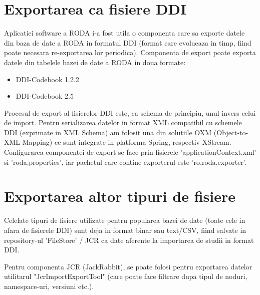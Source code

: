 \section{Exportarea ca fisiere DDI}
Aplicatiei software a RODA i-a fost utila o componenta care sa exporte datele din baza de date a RODA in formatul DDI (format care evolueaza in timp, fiind poate necesara re-exportarea lor periodica).
Componenta de export poate exporta datele din tabelele bazei de date a RODA in doua formate:
\begin{itemize}
\item DDI-Codebook 1.2.2
\item DDI-Codebook 2.5
\end{itemize}

Procesul de export al fisierelor DDI este, ca schema de principiu, unul invers celui de import.
Pentru serializarea datelor in format XML compatibil cu schemele DDI (exprimate in XML Schema) 
am folosit una din solutiile OXM (Object-to-XML Mapping) ce sunt integrate in platforma Spring, respectiv XStream.
Configurarea componentei de export se face prin fisierele 'applicationContext.xml' si 'roda.properties', iar pachetul care contine exporterul este 'ro.roda.exporter'.

\section{Exportarea altor tipuri de fisiere}
Celelate tipuri de fisiere utilizate pentru popularea bazei de date (toate cele in afara de fisierele DDI) sunt deja in format binar sau text/CSV, 
fiind salvate in repository-ul 'FileStore' / JCR ca date aferente la importarea de studii in format DDI.

Pentru componenta JCR (JackRabbit), 
se poate folosi pentru exportarea datelor utilitarul "JcrImportExportTool" 
(care poate face filtrare dupa tipul de noduri, namespace-uri, versiuni etc.).